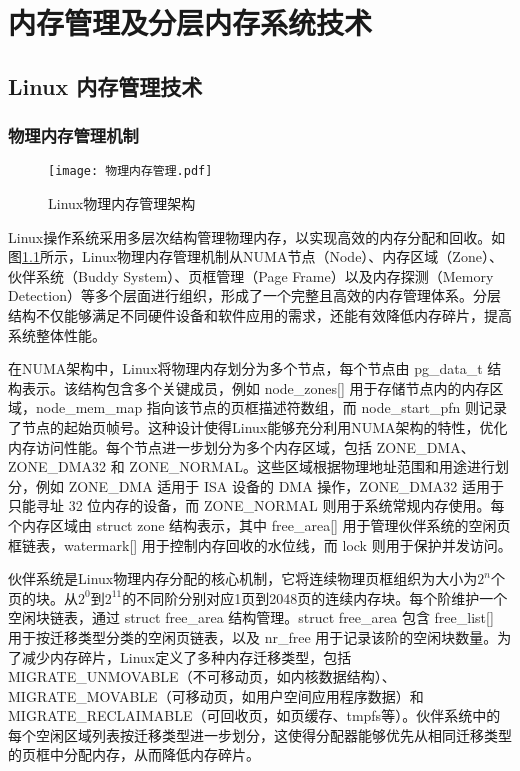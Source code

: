 \chapter{内存管理及分层内存系统技术}

\section{Linux 内存管理技术}

\subsection{物理内存管理机制}

\begin{figure}[htb]
    \centering
    \texttt{[image: 物理内存管理.pdf]}
    \caption{Linux物理内存管理架构}
    \label{物理内存管理}
\end{figure}

Linux操作系统采用多层次结构管理物理内存，以实现高效的内存分配和回收。如图\ref{物理内存管理}所示，Linux物理内存管理机制从NUMA节点（Node）、内存区域（Zone）、伙伴系统（Buddy System）、页框管理（Page Frame）以及内存探测（Memory Detection）等多个层面进行组织，形成了一个完整且高效的内存管理体系。分层结构不仅能够满足不同硬件设备和软件应用的需求，还能有效降低内存碎片，提高系统整体性能。

在NUMA架构中，Linux将物理内存划分为多个节点，每个节点由 pg\_data\_t 结构表示。该结构包含多个关键成员，例如 node\_zones[] 用于存储节点内的内存区域，node\_mem\_map 指向该节点的页框描述符数组，而 node\_start\_pfn 则记录了节点的起始页帧号。这种设计使得Linux能够充分利用NUMA架构的特性，优化内存访问性能。每个节点进一步划分为多个内存区域，包括 ZONE\_DMA、ZONE\_DMA32 和 ZONE\_NORMAL。这些区域根据物理地址范围和用途进行划分，例如 ZONE\_DMA 适用于 ISA 设备的 DMA 操作，ZONE\_DMA32 适用于只能寻址 32 位内存的设备，而 ZONE\_NORMAL 则用于系统常规内存使用。每个内存区域由 struct zone 结构表示，其中 free\_area[] 用于管理伙伴系统的空闲页框链表，watermark[] 用于控制内存回收的水位线，而 lock 则用于保护并发访问。

伙伴系统是Linux物理内存分配的核心机制，它将连续物理页框组织为大小为\(2^n\)个页的块。从\(2^0\)到\(2^{11}\)的不同阶分别对应1页到2048页的连续内存块。每个阶维护一个空闲块链表，通过 struct free\_area 结构管理。struct free\_area 包含 free\_list[] 用于按迁移类型分类的空闲页链表，以及 nr\_free 用于记录该阶的空闲块数量。为了减少内存碎片，Linux定义了多种内存迁移类型，包括 MIGRATE\_UNMOVABLE（不可移动页，如内核数据结构）、MIGRATE\_MOVABLE（可移动页，如用户空间应用程序数据）和 MIGRATE\_RECLAIMABLE（可回收页，如页缓存、tmpfs等）。伙伴系统中的每个空闲区域列表按迁移类型进一步划分，这使得分配器能够优先从相同迁移类型的页框中分配内存，从而降低内存碎片。

